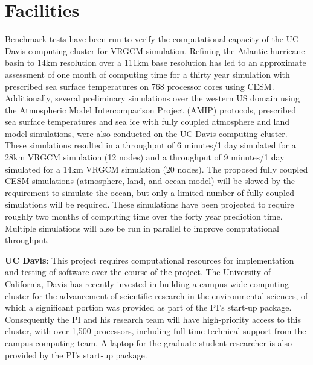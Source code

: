 \documentclass[11pt]{article}
\begin{document}
\setcounter{section}{2}

\section{Facilities}
Benchmark tests have been run to verify the computational capacity of the UC Davis computing cluster for VRGCM simulation. Refining the Atlantic hurricane basin to 14km resolution over a 111km base resolution has led to an approximate assessment of one month of computing time for a thirty year simulation with prescribed sea surface temperatures on 768 processor cores using CESM. Additionally, several preliminary simulations over the western US domain using the Atmospheric Model Intercomparison Project (AMIP) protocols, prescribed sea surface temperatures and sea ice with fully coupled atmosphere and land model simulations, were also conducted on the UC Davis computing cluster.  These simulations resulted in a  throughput of 6 minutes/1 day simulated for a 28km VRGCM simulation (12 nodes) and a throughput of 9 minutes/1 day simulated for a 14km VRGCM simulation (20 nodes).  The proposed fully coupled CESM simulations (atmosphere, land, and ocean model) will be slowed by the requirement to simulate the ocean, but only a limited number of fully coupled simulations will be required. These simulations have been projected to require roughly two months of computing time over the forty year prediction time. Multiple simulations will also be run in parallel to improve computational throughput.

\textbf{UC Davis}:  This project requires computational resources for implementation and testing of software over the course of the project. The University of California, Davis has recently invested in building a campus-wide computing cluster for the advancement of scientific research in the environmental sciences, of which a significant portion was provided as part of the PI’s start-up package. Consequently the PI and his research team will have high-priority access to this cluster, with over 1,500 processors, including full-time technical support from the campus computing team. A laptop for the graduate student researcher is also provided by the PI’s start-up package.
\end{document}
